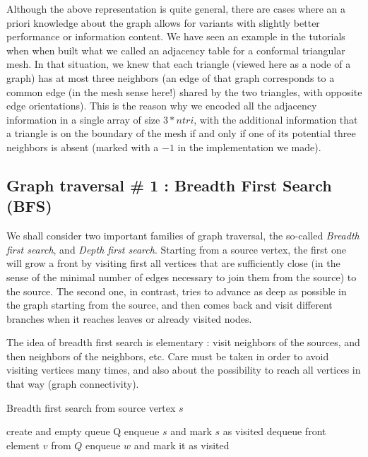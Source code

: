 \documentclass[12pt]{article}
\theoremstyle{plain}
\theoremstyle{remark}
\begin{document}
\medskip
Although the above representation is quite general, there are cases where an a
priori knowledge about the graph allows for variants with slightly better
performance or information content. We have seen an example in the tutorials
when when built what we called an adjacency table for a conformal triangular
mesh. In that situation, we knew that each triangle (viewed here as a node of a 
graph) has at most three neighbors (an edge of that graph corresponds to 
a common edge (in the mesh sense here!) shared by the two triangles, with opposite 
edge orientations). This is the reason why we encoded all the adjacency
information in a single array of size $3 * ntri$, with the additional
information that a triangle is on the boundary of the mesh if and only if one of
its potential three neighbors is absent (marked with a $-1$ in the 
implementation we made).


\subsection{Graph traversal \# 1 : Breadth First Search (BFS)}

We shall consider two important families of graph traversal, the so-called {\it
Breadth first search}, and {\it Depth first search}. Starting from a source
vertex, the first one will grow a front by visiting first all vertices that are
sufficiently close (in the sense of the minimal number of edges necessary to
join them from the source) to the source. The second one, in contrast, tries to 
advance as deep as possible in the graph starting from the source, and then
comes back and visit different branches when it reaches leaves or already
visited nodes. 

The idea of breadth first search is elementary : visit neighbors of the sources,
and then neighbors of the neighbors, etc. Care must be taken in order to avoid 
visiting vertices many times, and also about the possibility to reach all
vertices in that way (graph connectivity).

\medskip

\begin{algorithm}[H]
\caption{Breadth first search from source vertex $s$}
\begin{algorithmic}
\State create and empty queue Q
\State enqueue $s$ and mark $s$ as visited
\State dequeue front element $v$ from $Q$
	enqueue $w$ and mark it as visited
	\EndIf
	\EndFor
	\EndWhile
	\EndFunction
\end{algorithmic}
\end{algorithm}
\end{document}
